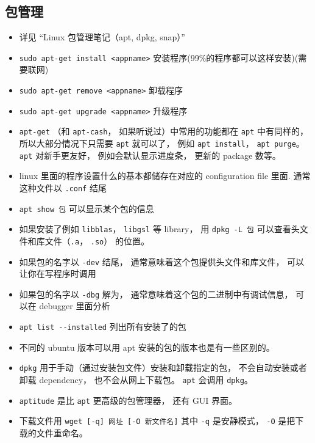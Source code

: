 \subsection{包管理}
\begin{itemize}
\item 详见 “Linux 包管理笔记（apt, dpkg, snap）”
\item \verb`sudo apt-get install <appname>` 安装程序(99\%的程序都可以这样安装)(需要联网)
\item \verb`sudo apt-get remove <appname>` 卸载程序
\item \verb`sudo apt-get upgrade <appname>` 升级程序
\item \verb`apt-get` （和 \verb`apt-cash`， 如果听说过）中常用的功能都在 \verb`apt` 中有同样的， 所以大部分情况下只需要 \verb`apt` 就可以了， 例如 \verb`apt install`， \verb`apt purge`。 \verb`apt` 对新手更友好， 例如会默认显示进度条， 更新的 package 数等。
\item linux 里面的程序设置什么的基本都储存在对应的 configuration file 里面. 通常这种文件以 \verb|.conf| 结尾
\item \verb`apt show 包` 可以显示某个包的信息
\item 如果安装了例如 \verb`libblas`， \verb`libgsl` 等 library， 用 \verb`dpkg -L 包` 可以查看头文件和库文件（\verb`.a`， \verb`.so`） 的位置。
\item 如果包的名字以 \verb`-dev` 结尾， 通常意味着这个包提供头文件和库文件， 可以让你在写程序时调用
\item 如果包的名字以 \verb`-dbg` 解为， 通常意味着这个包的二进制中有调试信息， 可以在 debugger 里面分析
\item \verb|apt list --installed| 列出所有安装了的包
\item 不同的 ubuntu 版本可以用 apt 安装的包的版本也是有一些区别的。
\item \verb|dpkg| 用于手动（通过安装包文件）安装和卸载指定的包， 不会自动安装或者卸载 dependency， 也不会从网上下载包。 \verb|apt| 会调用 \verb|dpkg|。
\item \verb|aptitude| 是比 \verb|apt| 更高级的包管理器， 还有 GUI 界面。
\item 下载文件用 \verb|wget [-q] 网址 [-O 新文件名]| 其中 \verb|-q| 是安静模式， \verb|-O| 是把下载的文件重命名。
\end{itemize}

